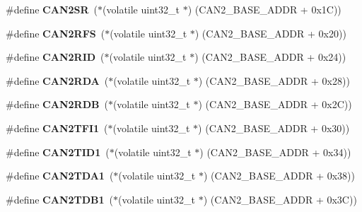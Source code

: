\begin{DoxyCompactItemize}
\#define {\bfseries C\+A\+N2\+SR}~($\ast$(volatile uint32\+\_\+t $\ast$) (C\+A\+N2\+\_\+\+B\+A\+S\+E\+\_\+\+A\+D\+DR + 0x1\+C))
\item 
\mbox{\label{group__lpc24xx__regs_ga7084af7dbe11f724f40345b42faf051e}} 
\#define {\bfseries C\+A\+N2\+R\+FS}~($\ast$(volatile uint32\+\_\+t $\ast$) (C\+A\+N2\+\_\+\+B\+A\+S\+E\+\_\+\+A\+D\+DR + 0x20))
\item 
\mbox{\label{group__lpc24xx__regs_ga273d274ca05365a160a9bcabe1416cbb}} 
\#define {\bfseries C\+A\+N2\+R\+ID}~($\ast$(volatile uint32\+\_\+t $\ast$) (C\+A\+N2\+\_\+\+B\+A\+S\+E\+\_\+\+A\+D\+DR + 0x24))
\item 
\mbox{\label{group__lpc24xx__regs_gab81a0a53731ad2b0f7ca24c57fd878db}} 
\#define {\bfseries C\+A\+N2\+R\+DA}~($\ast$(volatile uint32\+\_\+t $\ast$) (C\+A\+N2\+\_\+\+B\+A\+S\+E\+\_\+\+A\+D\+DR + 0x28))
\item 
\mbox{\label{group__lpc24xx__regs_gafbd806e79a209e476ffa42e182511d67}} 
\#define {\bfseries C\+A\+N2\+R\+DB}~($\ast$(volatile uint32\+\_\+t $\ast$) (C\+A\+N2\+\_\+\+B\+A\+S\+E\+\_\+\+A\+D\+DR + 0x2\+C))
\item 
\mbox{\label{group__lpc24xx__regs_ga1be70c105bcb52b5970336b5ecbb4c70}} 
\#define {\bfseries C\+A\+N2\+T\+F\+I1}~($\ast$(volatile uint32\+\_\+t $\ast$) (C\+A\+N2\+\_\+\+B\+A\+S\+E\+\_\+\+A\+D\+DR + 0x30))
\item 
\mbox{\label{group__lpc24xx__regs_ga6ae3aac6dffe23b3fe56dfe6df392d4d}} 
\#define {\bfseries C\+A\+N2\+T\+I\+D1}~($\ast$(volatile uint32\+\_\+t $\ast$) (C\+A\+N2\+\_\+\+B\+A\+S\+E\+\_\+\+A\+D\+DR + 0x34))
\item 
\mbox{\label{group__lpc24xx__regs_ga0e3a70b5f1816ef57fc327d759bef67c}} 
\#define {\bfseries C\+A\+N2\+T\+D\+A1}~($\ast$(volatile uint32\+\_\+t $\ast$) (C\+A\+N2\+\_\+\+B\+A\+S\+E\+\_\+\+A\+D\+DR + 0x38))
\item 
\mbox{\label{group__lpc24xx__regs_ga0e4ae7eb59f318a67df003bb83532d42}} 
\#define {\bfseries C\+A\+N2\+T\+D\+B1}~($\ast$(volatile uint32\+\_\+t $\ast$) (C\+A\+N2\+\_\+\+B\+A\+S\+E\+\_\+\+A\+D\+DR + 0x3\+C))

\end{DoxyCompactItemize}
